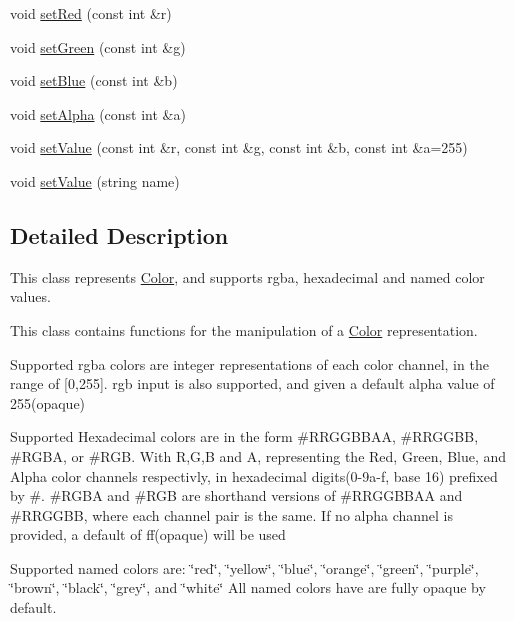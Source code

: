 \begin{DoxyCompactItemize}
\item 
void \hyperlink{classbridges_1_1_color_a56ff7cf20ccf252ed5fd9d1836693c42}{set\+Red} (const int \&r)
\item 
void \hyperlink{classbridges_1_1_color_ad7522440e9772446b66d699cda307704}{set\+Green} (const int \&g)
\item 
void \hyperlink{classbridges_1_1_color_abbde3c596c48b1870a305164b51dc9b5}{set\+Blue} (const int \&b)
\item 
void \hyperlink{classbridges_1_1_color_af2ab47aa5ccafb74be9ef8e6042093a1}{set\+Alpha} (const int \&a)
\item 
void \hyperlink{classbridges_1_1_color_a1bbb6b478ac6a013d04951f564bab70d}{set\+Value} (const int \&r, const int \&g, const int \&b, const int \&a=255)
\item 
void \hyperlink{classbridges_1_1_color_aa6e1db9aa47275ef829ac0fa96d72190}{set\+Value} (string name)
\end{DoxyCompactItemize}


\subsection{Detailed Description}
This class represents \hyperlink{classbridges_1_1_color}{Color}, and supports rgba, hexadecimal and named color values. 

This class contains functions for the manipulation of a \hyperlink{classbridges_1_1_color}{Color} representation.

Supported rgba colors are integer representations of each color channel, in the range of \mbox{[}0,255\mbox{]}. rgb input is also supported, and given a default alpha value of 255(opaque)

Supported Hexadecimal colors are in the form \#\+R\+R\+G\+G\+B\+B\+A\+A, \#\+R\+R\+G\+G\+B\+B, \#\+R\+G\+B\+A, or \#\+R\+G\+B. With R,G,B and A, representing the Red, Green, Blue, and Alpha color channels respectivly, in hexadecimal digits(0-\/9a-\/f, base 16) prefixed by \textquotesingle{}\#\textquotesingle{}. \#\+R\+G\+B\+A and \#\+R\+G\+B are shorthand versions of \#\+R\+R\+G\+G\+B\+B\+A\+A and \#\+R\+R\+G\+G\+B\+B, where each channel pair is the same. If no alpha channel is provided, a default of \textquotesingle{}ff\textquotesingle{}(opaque) will be used

Supported named colors are\+: \char`\"{}red\char`\"{}, \char`\"{}yellow\char`\"{}, \char`\"{}blue\char`\"{}, \char`\"{}orange\char`\"{}, \char`\"{}green\char`\"{}, \char`\"{}purple\char`\"{}, \char`\"{}brown\char`\"{}, \char`\"{}black\char`\"{}, \char`\"{}grey\char`\"{}, and \char`\"{}white\char`\"{} All named colors have are fully opaque by default.

